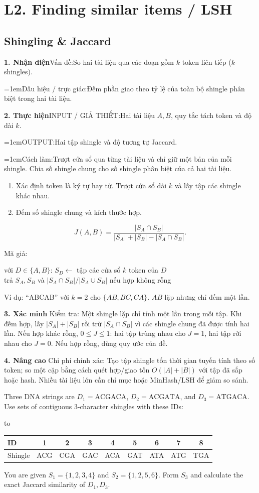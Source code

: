 \documentclass[10pt,a4paper,twocolumn]{article}
\makeatletter
\newcommand{\lecture}[2]{%
  \par
  \section{L#1. #2}\label{lecture:#1}}
\newif\ifexamheadingprinted
\newcommand{\topic}[2]{%
  \global\examheadingprintedfalse\par\subsection{#2}\label{topic:#1}}
\newcommand{\key}[1]{#1:\enspace}
\newcommand{\literal}[1]{“#1”}
\newcommand{\steps}[1]{\begin{enumerate}[label=\arabic*.,leftmargin=1.5em,itemsep=1pt,topsep=2pt]#1\end{enumerate}}
\newenvironment{examtable}[1]{%
  \par\addvspace{2pt}\noindent\hbox to \linewidth\bgroup\hfil
  \setlength{\tabcolsep}{4pt}%
  \renewcommand{\arraystretch}{1.12}\begin{tabular}{#1}%
}{\end{tabular}\hfil\egroup\par\addvspace{2pt}}
\newcommand{\algfield}[2]{\par\noindent\hangindent=1em\relax#1:\enspace#2}
\newcommand{\unitheading}[2]{%
  \par\addvspace{1pt}\noindent\textbf{#1. #2}\enspace}
\newcommand{\unitverification}{\unitheading{3}{Xác minh}}
\newcommand{\unitadvanced}{\unitheading{4}{Nâng cao}}
\newcommand{\unitfield}[4]{%
  \par\noindent\textbf{#1. #2}\enspace #3:\enspace #4}
\newcommand{\algsummary}[6]{%
  \begingroup\setlength{\parskip}{1pt}%
  \unitfield{1}{Nhận diện}{Vấn đề}{#1}%
  \algfield{Dấu hiệu / trực giác}{#2}%
  \if\relax\detokenize{#3}\relax\else\par\noindent#3\par\fi%
  \unitfield{2}{Thực hiện}{INPUT / GIẢ THIẾT}{#4}%
  \algfield{OUTPUT}{#5}%
  \algfield{Cách làm}{#6}\par\endgroup}
\newenvironment{algpseudo}{%
  \par\addvspace{2pt}\noindent
  \setlength{\parskip}{0pt}%
  Mã giả:\par\nobreak
  \begin{list}{}{\setlength{\leftmargin}{1em}\setlength{\topsep}{0pt}%
    \setlength{\partopsep}{0pt}\setlength{\parsep}{0pt}%
    \@beginparpenalty=10000\relax}%
  \item\relax
}{\end{list}\par\addvspace{3pt}}
\makeatother
\begin{document}
\lecture{2}{Finding similar items / LSH}
\topic{jaccard}{Shingling \& Jaccard}

\algsummary{So hai tài liệu qua các đoạn gồm $k$ token liên tiếp ($k$-shingles).}{Đếm phần giao theo tỷ lệ của toàn bộ shingle phân biệt trong hai tài liệu.}{}{Hai tài liệu $A,B$, quy tắc tách token và độ dài $k$.}{Hai tập shingle và độ tương tự Jaccard.}{Trượt cửa sổ qua từng tài liệu và chỉ giữ một bản của mỗi shingle. Chia số shingle chung cho số shingle phân biệt của cả hai tài liệu.}

\steps{
\item Xác định token là ký tự hay từ. Trượt cửa sổ dài $k$ và lấy tập các shingle khác nhau.
\item Đếm số shingle chung và kích thước hợp.
}
\[
J(A,B)=\frac{|S_A\cap S_B|}{|S_A|+|S_B|-|S_A\cap S_B|}.
\]

\begin{algpseudo}
với $D\in\{A,B\}$: $S_D\gets$ tập các cửa sổ $k$ token của $D$\\
trả $S_A,S_B$ và $|S_A\cap S_B|/|S_A\cup S_B|$ nếu hợp không rỗng
\end{algpseudo}

\key{Ví dụ} \literal{ABCAB} với $k=2$ cho $\{AB,BC,CA\}$. $AB$ lặp nhưng chỉ đếm một lần.


\unitverification
\key{Kiểm tra} Một shingle lặp chỉ tính một lần trong mỗi tập. Khi đếm hợp, lấy $|S_A|+|S_B|$ rồi trừ $|S_A\cap S_B|$ vì các shingle chung đã được tính hai lần. Nếu hợp khác rỗng, $0\le J\le1$: hai tập trùng nhau cho $J=1$, hai tập rời nhau cho $J=0$. Nếu hợp rỗng, dùng quy ước của đề.

\unitadvanced
\key{Chi phí chính xác} Tạo tập shingle tốn thời gian tuyến tính theo số token; so một cặp bằng cách quét hợp/giao tốn $O(|A|+|B|)$ với tập đã sắp hoặc hash. Nhiều tài liệu lớn cần chỉ mục hoặc MinHash/LSH để giảm so sánh.

Three DNA strings are $D_1=\mathrm{ACGACA}$, $D_2=\mathrm{ACGATA}$, and $D_3=\mathrm{ATGACA}$. Use sets of contiguous 3-character shingles with these IDs:
\begin{examtable}{@{}lcccccccc@{}}
\toprule
ID & 1 & 2 & 3 & 4 & 5 & 6 & 7 & 8\\
\midrule
Shingle & ACG & CGA & GAC & ACA & GAT & ATA & ATG & TGA\\
\bottomrule
\end{examtable}
You are given $S_1=\{1,2,3,4\}$ and $S_2=\{1,2,5,6\}$.
 Form $S_3$ and calculate the exact Jaccard similarity of $D_1,D_3$.
\end{document}
